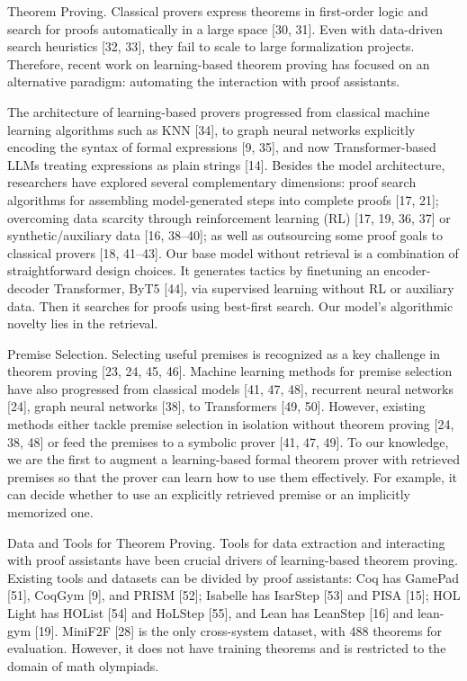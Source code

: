 \documentclass[
]{article}
\begin{document}
Theorem Proving. Classical provers express theorems in first-order logic
and search for proofs automatically in a large space {[}30, 31{]}. Even
with data-driven search heuristics {[}32, 33{]}, they fail to scale to
large formalization projects. Therefore, recent work on learning-based
theorem proving has focused on an alternative paradigm: automating the
interaction with proof assistants.

The architecture of learning-based provers progressed from classical
machine learning algorithms such as KNN {[}34{]}, to graph neural
networks explicitly encoding the syntax of formal expressions {[}9,
35{]}, and now Transformer-based LLMs treating expressions as plain
strings {[}14{]}. Besides the model architecture, researchers have
explored several complementary dimensions: proof search algorithms for
assembling model-generated steps into complete proofs {[}17, 21{]};
overcoming data scarcity through reinforcement learning (RL) {[}17, 19,
36, 37{]} or synthetic/auxiliary data {[}16, 38--40{]}; as well as
outsourcing some proof goals to classical provers {[}18, 41--43{]}. Our
base model without retrieval is a combination of straightforward design
choices. It generates tactics by finetuning an encoder-decoder
Transformer, ByT5 {[}44{]}, via supervised learning without RL or
auxiliary data. Then it searches for proofs using best-first search. Our
model's algorithmic novelty lies in the retrieval.

Premise Selection. Selecting useful premises is recognized as a key
challenge in theorem proving {[}23, 24, 45, 46{]}. Machine learning
methods for premise selection have also progressed from classical models
{[}41, 47, 48{]}, recurrent neural networks {[}24{]}, graph neural
networks {[}38{]}, to Transformers {[}49, 50{]}. However, existing
methods either tackle premise selection in isolation without theorem
proving {[}24, 38, 48{]} or feed the premises to a symbolic prover
{[}41, 47, 49{]}. To our knowledge, we are the first to augment a
learning-based formal theorem prover with retrieved premises so that the
prover can learn how to use them effectively. For example, it can decide
whether to use an explicitly retrieved premise or an implicitly
memorized one.

Data and Tools for Theorem Proving. Tools for data extraction and
interacting with proof assistants have been crucial drivers of
learning-based theorem proving. Existing tools and datasets can be
divided by proof assistants: Coq has GamePad {[}51{]}, CoqGym {[}9{]},
and PRISM {[}52{]}; Isabelle has IsarStep {[}53{]} and PISA {[}15{]};
HOL Light has HOList {[}54{]} and HoLStep {[}55{]}, and Lean has
LeanStep {[}16{]} and lean-gym {[}19{]}. MiniF2F {[}28{]} is the only
cross-system dataset, with 488 theorems for evaluation. However, it does
not have training theorems and is restricted to the domain of math
olympiads.
\end{document}
